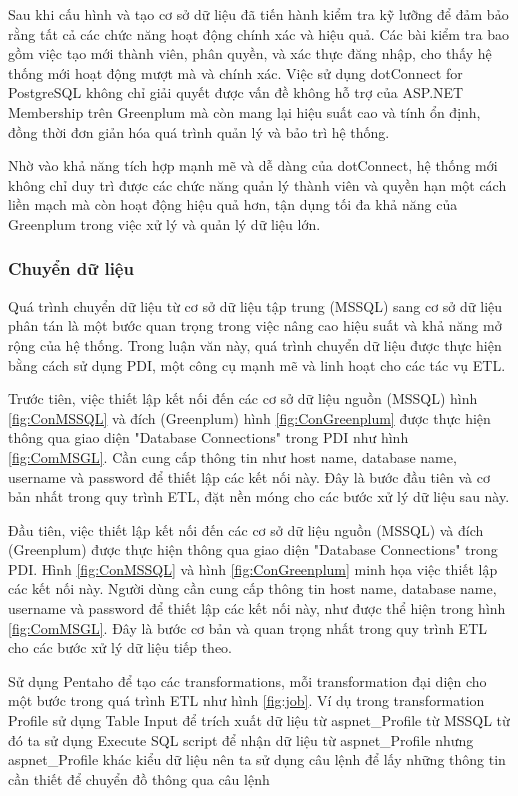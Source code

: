 Sau khi cấu hình và tạo cơ sở dữ liệu đã tiến hành kiểm tra kỹ lưỡng để đảm bảo rằng tất cả các chức năng hoạt động chính xác và hiệu quả. Các bài kiểm tra bao gồm việc tạo mới thành viên, phân quyền, và xác thực đăng nhập, cho thấy hệ thống mới hoạt động mượt mà và chính xác. Việc sử dụng dotConnect for PostgreSQL không chỉ giải quyết được vấn đề không hỗ trợ của ASP.NET Membership trên Greenplum mà còn mang lại hiệu suất cao và tính ổn định, đồng thời đơn giản hóa quá trình quản lý và bảo trì hệ thống.

Nhờ vào khả năng tích hợp mạnh mẽ và dễ dàng của dotConnect, hệ thống mới không chỉ duy trì được các chức năng quản lý thành viên và quyền hạn một cách liền mạch mà còn hoạt động hiệu quả hơn, tận dụng tối đa khả năng của Greenplum trong việc xử lý và quản lý dữ liệu lớn.

\subsubsection{Chuyển dữ liệu}

Quá trình chuyển dữ liệu từ cơ sở dữ liệu tập trung (MSSQL) sang cơ sở dữ liệu phân tán là một bước quan trọng trong việc nâng cao hiệu suất và khả năng mở rộng của hệ thống. Trong luận văn này, quá trình chuyển dữ liệu được thực hiện bằng cách sử dụng PDI, một công cụ mạnh mẽ và linh hoạt cho các tác vụ ETL.

Trước tiên, việc thiết lập kết nối đến các cơ sở dữ liệu nguồn (MSSQL) hình \ref{fig:ConMSSQL} và đích (Greenplum) hình \ref{fig:ConGreenplum}  được thực hiện thông qua giao diện "Database Connections" trong PDI như hình \ref{fig:ComMSGL}. Cần cung cấp thông tin như host name, database name, username và password để thiết lập các kết nối này. Đây là bước đầu tiên và cơ bản nhất trong quy trình ETL, đặt nền móng cho các bước xử lý dữ liệu sau này.

Đầu tiên, việc thiết lập kết nối đến các cơ sở dữ liệu nguồn (MSSQL) và đích (Greenplum) được thực hiện thông qua giao diện "Database Connections" trong PDI. Hình \ref{fig:ConMSSQL} và hình \ref{fig:ConGreenplum} minh họa việc thiết lập các kết nối này. Người dùng cần cung cấp thông tin host name, database name, username và password để thiết lập các kết nối này, như được thể hiện trong hình \ref{fig:ComMSGL}. Đây là bước cơ bản và quan trọng nhất trong quy trình ETL cho các bước xử lý dữ liệu tiếp theo.

Sử dụng Pentaho để tạo các transformations, mỗi transformation đại diện cho một bước trong quá trình ETL như hình \ref{fig:job}. Ví dụ trong transformation Profile sử dụng Table Input để trích xuất dữ liệu từ aspnet\_Profile từ MSSQL từ đó ta sử dụng Execute SQL script để nhận dữ liệu từ aspnet\_Profile nhưng aspnet\_Profile khác kiểu dữ liệu nên ta sử dụng câu lệnh để lấy những thông tin cần thiết để chuyển đồ thông qua câu lệnh

